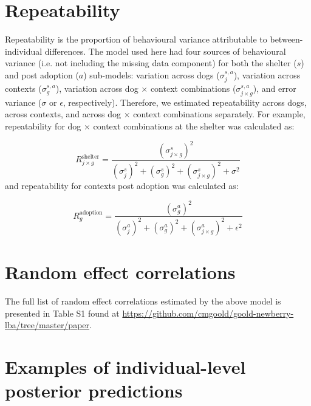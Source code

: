 \documentclass[12pt]{article}
\begin{document}
\newpage
\section{Repeatability}
Repeatability is the proportion of behavioural variance attributable to between-individual differences. The model used here had four sources of behavioural variance (i.e. not including the missing data component) for both the shelter ($s$) and post adoption ($a$) sub-models: variation across dogs ($\sigma_{j}^{s,a}$), variation across contexts ($\sigma_{g}^{s,a}$), variation across dog $\times$ context combinations ($\sigma_{j \times g}^{s,a}$), and error variance ($\sigma$ or $\epsilon$, respectively). Therefore, we estimated repeatability across dogs, across contexts, and across dog $\times$ context combinations separately. For example, repeatability for dog $\times$ context combinations at the shelter was calculated as:

\begin{equation}
  R_{j \times g}^{\text{shelter}} = \frac{(\sigma_{j \times g}^{s})^2}{(\sigma_{j}^{s})^2 + (\sigma_{g}^{s})^2 + (\sigma_{j \times g}^{s})^2 + \sigma^2}
\end{equation}
%
and repeatability for contexts post adoption was calculated as:

\begin{equation}
  R_{g}^{\text{adoption}} = \frac{(\sigma_{g}^{a})^2}{(\sigma_{j}^{a})^2 + (\sigma_{g}^{a})^2 + (\sigma_{j \times g}^{a})^2 + \epsilon^2}
\end{equation}

\newpage
\section{Random effect correlations}
The full list of random effect correlations estimated by the above model is presented in Table S1 found at \href{https://github.com/cmgoold/goold-newberry-lba/tree/master/paper}{https://github.com/cmgoold/goold-newberry-lba/tree/master/paper}.

\newpage
\section{Examples of individual-level posterior predictions}
\end{document}
